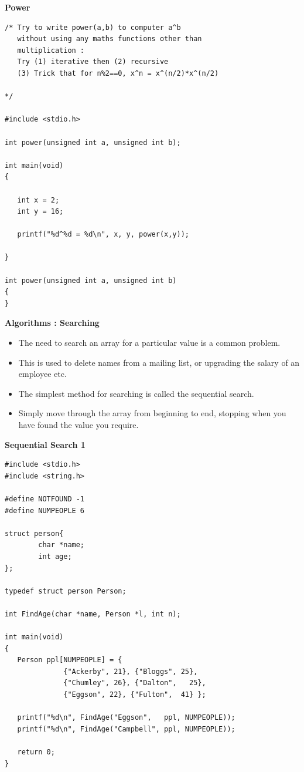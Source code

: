 \documentclass[a4,portraitt]{slides}
\begin{document}
\newpage
{\samepage
\begin{center}
{\Large{\bf Power}}
\end{center}
{\small
\begin{verbatim}
/* Try to write power(a,b) to computer a^b
   without using any maths functions other than
   multiplication :
   Try (1) iterative then (2) recursive
   (3) Trick that for n%2==0, x^n = x^(n/2)*x^(n/2)

*/

#include <stdio.h>

int power(unsigned int a, unsigned int b);

int main(void)
{

   int x = 2;
   int y = 16;

   printf("%d^%d = %d\n", x, y, power(x,y));

}

int power(unsigned int a, unsigned int b)
{
}
\end{verbatim}
}}

\newpage
{\samepage
\begin{center}
{\Large{\bf Algorithms : Searching}}
\end{center}
{\large
\begin{itemize}
\item The need to search an array for a particular value is a common problem.
\item This is used to delete names from a mailing list,
or upgrading the salary of an employee etc.
\item The simplest method for searching is called the sequential search.
\item Simply move through the array from beginning to end,
stopping when you have found the value you require.
\end{itemize}
}
}

\newpage
{\samepage
\begin{center}
{\Large{\bf Sequential Search 1}}
\end{center}
{\small
\begin{verbatim}
#include <stdio.h>
#include <string.h>

#define NOTFOUND -1
#define NUMPEOPLE 6

struct person{
        char *name;
        int age;
};

typedef struct person Person;

int FindAge(char *name, Person *l, int n);

int main(void)
{
   Person ppl[NUMPEOPLE] = {
              {"Ackerby", 21}, {"Bloggs", 25},
              {"Chumley", 26}, {"Dalton",   25},
              {"Eggson", 22}, {"Fulton",  41} };

   printf("%d\n", FindAge("Eggson",   ppl, NUMPEOPLE));
   printf("%d\n", FindAge("Campbell", ppl, NUMPEOPLE));

   return 0;
}
\end{verbatim}
}}
\end{document}
